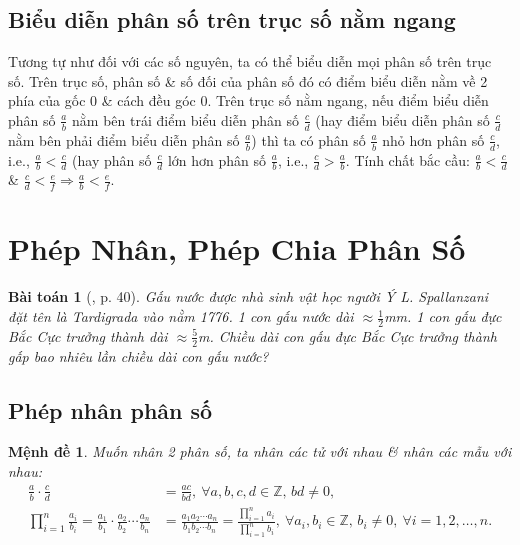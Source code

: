 \documentclass{article}
\newtheorem{baitoan}{Bài toán}
\newtheorem{menhde}{Mệnh đề}
\begin{document}
\subsection{Biểu diễn phân số trên trục số nằm ngang}
Tương tự như đối với các số nguyên, ta có thể biểu diễn mọi phân số trên trục số. Trên trục số, phân số \& số đối của phân số đó có điểm biểu diễn nằm về 2 phía của gốc 0 \& cách đều góc 0. Trên trục số nằm ngang, nếu điểm biểu diễn phân số $\frac{a}{b}$ nằm bên trái điểm biểu diễn phân số $\frac{c}{d}$ (hay điểm biểu diễn phân số $\frac{c}{d}$ nằm bên phải điểm biểu diễn phân số $\frac{a}{b}$) thì ta có phân số $\frac{a}{b}$ nhỏ hơn phân số $\frac{c}{d}$, i.e., $\frac{a}{b} < \frac{c}{d}$ (hay phân số $\frac{c}{d}$ lớn hơn phân số $\frac{a}{b}$, i.e., $\frac{c}{d} > \frac{a}{b}$. Tính chất bắc cầu: $\frac{a}{b} < \frac{c}{d}$ \& $\frac{c}{d} < \frac{e}{f}\Rightarrow\frac{a}{b} < \frac{e}{f}$.


\section{Phép Nhân, Phép Chia Phân Số}

\begin{baitoan}[\cite{SGK_Toan_6_Canh_Dieu_tap_2}, p. 40]
	Gấu nước được nhà sinh vật học người Ý L. Spallanzani đặt tên là Tardigrada vào nằm 1776. 1 con gấu nước dài $\approx\frac{1}{2}$\emph{mm}. 1 con gấu đực Bắc Cực trưởng thành dài $\approx\frac{5}{2}$\emph{m}. Chiều dài con gấu đực Bắc Cực trưởng thành gấp bao nhiêu lần chiều dài con gấu nước?
\end{baitoan}

\subsection{Phép nhân phân số}

\begin{menhde}
	Muốn nhân 2 phân số, ta nhân các tử với nhau \& nhân các mẫu với nhau:
	\begin{align*}
		\frac{a}{b}\cdot\frac{c}{d} &= \frac{ac}{bd},\ \forall a,b,c,d\in\mathbb{Z},\,bd\ne0,\\
		\prod_{i=1}^n \frac{a_i}{b_i} = \frac{a_1}{b_1}\cdot\frac{a_2}{b_2}\cdots\frac{a_n}{b_n} &= \frac{a_1a_2\cdots a_n}{b_1b_2\cdots b_n} = \frac{\prod_{i=1}^n a_i}{\prod_{i=1}^n b_i},\ \forall a_i,b_i\in\mathbb{Z},\,b_i\ne0,\ \forall i = 1,2,\ldots,n.
	\end{align*}
\end{menhde}
\end{document}
